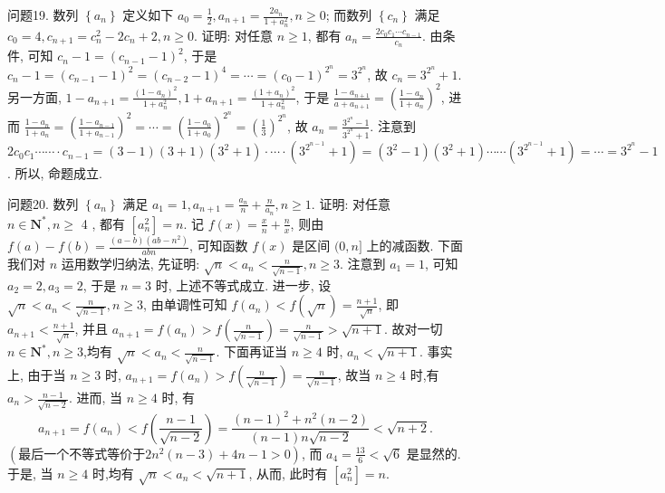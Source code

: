 问题19. 数列 $\left\{a_n\right\}$ 定义如下 $a_0=\frac{1}{2}, a_{n+1}=\frac{2 a_n}{1+a_n^2}, n \geqslant 0$; 而数列 $\left\{c_n\right\}$ 满足 $c_0= 4, c_{n+1}=c_n^2-2 c_n+2, n \geqslant 0$.
证明: 对任意 $n \geqslant 1$, 都有 $a_n=\frac{2 c_0 c_1 \cdots c_{n-1}}{c_n}$.
由条件, 可知 $c_n-1=\left(c_{n-1}-1\right)^2$, 于是 $c_n-1=\left(c_{n-1}-1\right)^2= \left(c_{n-2}-1\right)^4=\cdots=\left(c_0-1\right)^{2^n}=3^{2^n}$, 故 $c_n=3^{2^n}+1$.
另一方面, $1-a_{n+1}=\frac{\left(1-a_n\right)^2}{1+a_n^2}, 1+a_{n+1}=\frac{\left(1+a_n\right)^2}{1+a_n^2}$, 于是 $\frac{1-a_{n+1}}{a+a_{n+1}}= \left(\frac{1-a_n}{1+a_n}\right)^2$, 进而 $\frac{1-a_n}{1+a_n}=\left(\frac{1-a_{n-1}}{1+a_{n-1}}\right)^2=\cdots=\left(\frac{1-a_0}{1+a_0}\right)^{2^n}=\left(\frac{1}{3}\right)^{2^n}$, 故 $a_n=\frac{3^{2^n}-1}{3^{2^n}+1}$.
注意到 $2 c_0 c_1 \cdots \cdots \cdot c_{n-1}=(3-1)(3+1)\left(3^2+1\right) \cdot \cdots \cdot\left(3^{2^{n-1}}+1\right)= \left(3^2-1\right)\left(3^2+1\right) \cdots \cdots\left(3^{2^{n-1}}+1\right)=\cdots=3^{2^n}-1$. 所以, 命题成立.



问题20. 数列 $\left\{a_n\right\}$ 满足 $a_1=1, a_{n+1}=\frac{a_n}{n}+\frac{n}{a_n}, n \geqslant 1$. 证明: 对任意 $n \in \mathbf{N}^*, n \geqslant$ 4 , 都有 $\left[a_n^2\right]=n$.
记 $f(x)=\frac{x}{n}+\frac{n}{x}$, 则由 $f(a)-f(b)=\frac{(a-b)\left(a b-n^2\right)}{a b n}$, 可知函数 $f(x)$ 是区间 $(0, n]$ 上的减函数.
下面我们对 $n$ 运用数学归纳法, 先证明: $\sqrt{n}<a_n<\frac{n}{\sqrt{n-1}}, n \geqslant 3$.
注意到 $a_1=1$, 可知 $a_2=2, a_3=2$, 于是 $n=3$ 时, 上述不等式成立.
进一步, 设 $\sqrt{n}<a_n<\frac{n}{\sqrt{n-1}}, n \geqslant 3$, 由单调性可知 $f\left(a_n\right)<f(\sqrt{n})=\frac{n+1}{\sqrt{n}}$, 即 $a_{n+1}<\frac{n+1}{\sqrt{n}}$, 并且 $a_{n+1}=f\left(a_n\right)>f\left(\frac{n}{\sqrt{n-1}}\right)=\frac{n}{\sqrt{n-1}}>\sqrt{n+1}$. 故对一切 $n \in \mathbf{N}^*, n \geqslant 3$,均有 $\sqrt{n}<a_n<\frac{n}{\sqrt{n-1}}$.
下面再证当 $n \geqslant 4$ 时, $a_n<\sqrt{n+1}$.
事实上, 由于当 $n \geqslant 3$ 时, $a_{n+1}=f\left(a_n\right)>f\left(\frac{n}{\sqrt{n-1}}\right)=\frac{n}{\sqrt{n-1}}$, 故当 $n \geqslant 4$ 时,有 $a_n>\frac{n-1}{\sqrt{n-2}}$. 进而, 当 $n \geqslant 4$ 时, 有
$$
a_{n+1}=f\left(a_n\right)<f\left(\frac{n-1}{\sqrt{n-2}}\right)=\frac{(n-1)^2+n^2(n-2)}{(n-1) n \sqrt{n-2}}<\sqrt{n+2} .
$$
$\left( \text{最后一个不等式等价于} 2 n^2(n-3)+4 n-1>0\right)$, 而 $a_4=\frac{13}{6}<\sqrt{6}$ 是显然的.
于是, 当 $n \geqslant 4$ 时,均有 $\sqrt{n}<a_n<\sqrt{n+1}$, 从而, 此时有 $\left[a_n^2\right]=n$.



